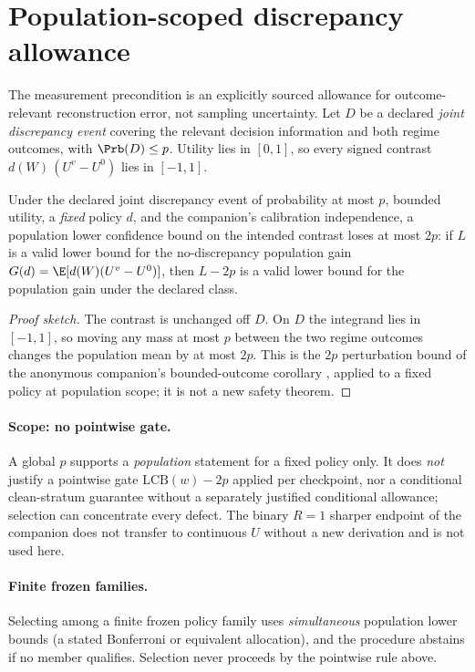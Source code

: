 \section{Population-scoped discrepancy allowance}
\label{sec:b-theory}

The measurement precondition is an explicitly sourced allowance for
outcome-relevant reconstruction error, not sampling uncertainty.  Let $D$ be a
declared \emph{joint discrepancy event} covering the relevant decision
information and both regime outcomes, with $\Prb(D)\le p$.  Utility lies in
$[0,1]$, so every signed contrast $d(W)\,(U^v-U^0)$ lies in $[-1,1]$.

\begin{proposition}
\label{prop:n1-population}
Under the declared joint discrepancy event of probability at most $p$, bounded
utility, a \emph{fixed} policy $d$, and the companion's calibration
independence, a population lower confidence bound on the intended contrast loses
at most $2p$: if $L$ is a valid lower bound for the no-discrepancy population
gain $G(d)=\E[d(W)(U^v-U^0)]$, then $L-2p$ is a valid lower bound for the
population gain under the declared class.
\end{proposition}

\begin{proof}[Proof sketch]
The contrast is unchanged off $D$.  On $D$ the integrand lies in $[-1,1]$, so
moving any mass at most $p$ between the two regime outcomes changes the
population mean by at most $2p$.  This is the $2p$ perturbation bound of the
anonymous companion's bounded-outcome corollary \citep{companion2026}, applied
to a fixed policy at population scope; it is not a new safety theorem.
\end{proof}

\paragraph{Scope: no pointwise gate.}
A global $p$ supports a \emph{population} statement for a fixed policy only.  It
does \emph{not} justify a pointwise gate $\mathrm{LCB}(w)-2p$ applied per
checkpoint, nor a conditional clean-stratum guarantee without a separately
justified conditional allowance; selection can concentrate every defect.  The
binary $R=1$ sharper endpoint of the companion does not transfer to continuous
$U$ without a new derivation and is not used here.

\paragraph{Finite frozen families.}
Selecting among a finite frozen policy family uses \emph{simultaneous} population
lower bounds (a stated Bonferroni or equivalent allocation), and the procedure
abstains if no member qualifies.  Selection never proceeds by the pointwise rule
above.

